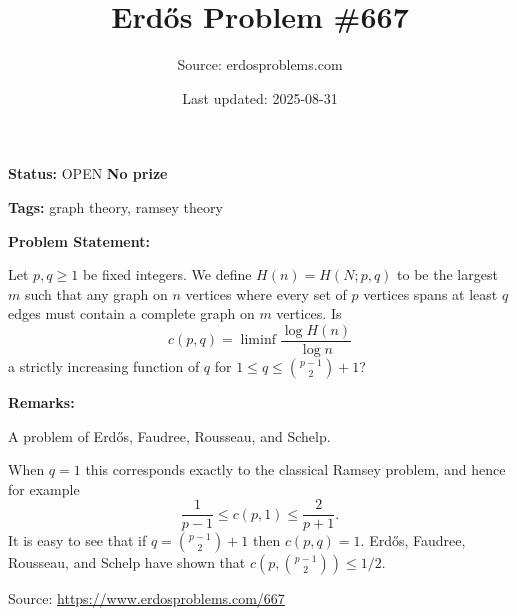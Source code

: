 \documentclass{article}
\title{Erd\H{o}s Problem \#667}
\date{Last updated: 2025-08-31}
\author{Source: erdosproblems.com}
\begin{document}
\maketitle

\noindent\textbf{Status:} OPEN \quad \textbf{No prize}

\noindent\textbf{Tags:} graph theory, ramsey theory

\medskip
\noindent\textbf{Problem Statement:}

Let $p,q\geq 1$ be fixed integers. We define $H(n)=H(N;p,q)$ to be the largest $m$ such that any graph on $n$ vertices where every set of $p$ vertices spans at least $q$ edges must contain a complete graph on $m$ vertices.
Is\[c(p,q)=\liminf \frac{\log H(n)}{\log n}\]a strictly increasing function of $q$ for $1\leq q\leq \binom{p-1}{2}+1$?

\bigskip
\noindent\textbf{Remarks:}

A problem of Erd\H{o}s, Faudree, Rousseau, and Schelp.

When $q=1$ this corresponds exactly to the classical Ramsey problem, and hence for example\[\frac{1}{p-1}\leq c(p,1) \leq \frac{2}{p+1}.\]It is easy to see that if $q=\binom{p-1}{2}+1$ then $c(p,q)=1$. Erd\H{o}s, Faudree, Rousseau, and Schelp have shown that $c(p,\binom{p-1}{2})\leq 1/2$.

\bigskip
\noindent\small{Source: \url{https://www.erdosproblems.com/667}}
\end{document}
